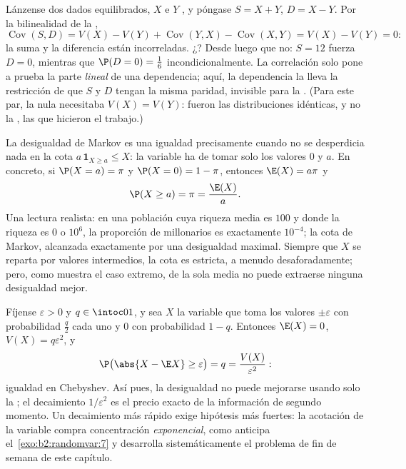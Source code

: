 \begin{example}\label{ex:b2:randomvar:sumdiff}
Lánzense dos dados equilibrados, $X$ e $Y$ , y póngase
$S = X + Y$, $D = X - Y$. Por la bilinealidad de la ,
\[
\operatorname{Cov}(S, D) = V(X) - V(Y) +
\operatorname{Cov}(Y, X) - \operatorname{Cov}(X, Y) = V(X) -
V(Y) = 0 :
\]
la suma y la diferencia están incorreladas. ¿?
Desde luego que no: $S = 12$ fuerza $D = 0$, mientras que $\P(D = 0)
= \frac16$ incondicionalmente. La correlación solo pone a prueba la
parte \emph{lineal} de una dependencia; aquí, la dependencia la lleva
la restricción de que $S$ y $D$ tengan la misma paridad, invisible
para la . (Para este par, la  nula necesitaba
$V(X) = V(Y)$: fueron las distribuciones idénticas, y no la
, las que hicieron el trabajo.)
\end{example}

\begin{example}\label{ex:b2:randomvar:markovsharp}
La desigualdad de Markov es una igualdad precisamente cuando no se
desperdicia nada en la cota $a\,\mathbf 1_{X\geq a} \leq X$: la
variable ha de tomar solo los valores $0$ y $a$. En concreto, si
$\P(X = a) = \pi$ y $\P(X = 0) = 1 - \pi$, entonces $\E(X) = a\pi$ y
\[
\P(X \geq a) = \pi = \frac{\E(X)}{a} .
\]
Una lectura realista: en una población cuya riqueza media es $100$ y
donde la riqueza es $0$ o $10^6$, la proporción de millonarios es
exactamente $10^{-4}$; la cota de Markov, alcanzada exactamente por
una desigualdad maximal. Siempre que $X$ se reparta por valores
intermedios, la cota es estricta, a menudo desaforadamente; pero,
como muestra el caso extremo, de la sola media no puede extraerse
ninguna desigualdad mejor.
\end{example}

\begin{example}\label{ex:b2:randomvar:chebsharp}
Fíjense $\varepsilon > 0$ y $q \in \intoc01$, y sea $X$ la variable
que toma los valores $\pm\varepsilon$ con probabilidad $\frac q2$
cada uno y $0$ con probabilidad $1 - q$. Entonces $\E(X) = 0$, $V(X)
= q\varepsilon^2$, y
\[
\P\bigl(\abs{X - \E X} \geq \varepsilon\bigr) = q
= \frac{V(X)}{\varepsilon^2} :
\]
igualdad en Chebyshev. Así pues, la desigualdad no puede mejorarse
usando solo la ; el decaimiento $1/\varepsilon^2$ es el
precio exacto de la información de segundo momento. Un decaimiento
más rápido exige hipótesis más fuertes: la acotación de la variable
compra concentración \emph{exponencial}, como anticipa el~\cref{exo:b2:randomvar:7} y desarrolla sistemáticamente el problema
de fin de semana de este capítulo.
\end{example}


